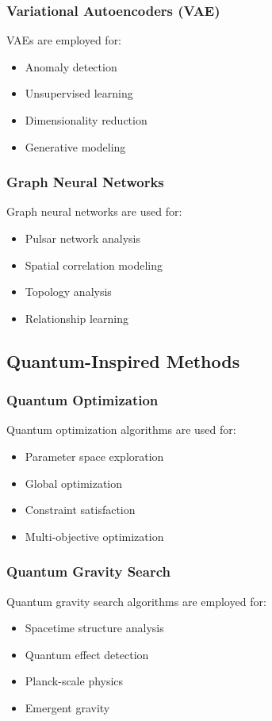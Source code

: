 \subsubsection{Variational Autoencoders (VAE)}
VAEs are employed for:
\begin{itemize}
    \item Anomaly detection
    \item Unsupervised learning
    \item Dimensionality reduction
    \item Generative modeling
\end{itemize}

\subsubsection{Graph Neural Networks}
Graph neural networks are used for:
\begin{itemize}
    \item Pulsar network analysis
    \item Spatial correlation modeling
    \item Topology analysis
    \item Relationship learning
\end{itemize}

\subsection{Quantum-Inspired Methods}

\subsubsection{Quantum Optimization}
Quantum optimization algorithms are used for:
\begin{itemize}
    \item Parameter space exploration
    \item Global optimization
    \item Constraint satisfaction
    \item Multi-objective optimization
\end{itemize}

\subsubsection{Quantum Gravity Search}
Quantum gravity search algorithms are employed for:
\begin{itemize}
    \item Spacetime structure analysis
    \item Quantum effect detection
    \item Planck-scale physics
    \item Emergent gravity
\end{itemize}


